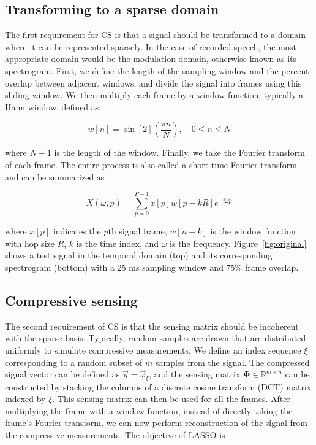 \documentclass[10pt,a4paper,twoside]{article}
\begin{document}
\subsection{Transforming to a sparse domain}\label{ssec:sparse}
The first requirement for CS is that a signal should be transformed to a domain where it can be represented sparsely. In the case of recorded speech, the most appropriate domain would be the modulation domain, otherwise known as its spectrogram. First, we define the length of the sampling window and the percent overlap between adjacent windows, and divide the signal into frames using this sliding window. We then multiply each frame by a window function, typically a Hann window, defined as

\begin{equation}\label{eq:hann}
	w[n] = \sin[2](\frac{\pi n}{N}), \quad 0 \leq n \leq N
\end{equation}

\noindent where $N+1$ is the length of the window. Finally, we take the Fourier transform of each frame. The entire process is also called a short-time Fourier transform and can be summarized as

\begin{equation}\label{eq:stft}
	X(\omega, p) = \sum_{p=0}^{P-1} x[p] w[p - kR] e^{-i\omega p}
\end{equation}

\noindent where $x[p]$ indicates the $p$th signal frame, $w[n-k]$ is the window function with hop size $R$, $k$ is the time index, and $\omega$ is the frequency. Figure~\ref{fig:original} shows a test signal in the temporal domain (top) and its corresponding spectrogram (bottom) with a 25 ms sampling window and 75\% frame overlap.

\subsection{Compressive sensing}\label{ssec:cs}
The second requirement of CS is that the sensing matrix should be incoherent with the sparse basis. Typically, random samples are drawn that are distributed uniformly to simulate compressive measurements. We define an index sequence $\xi$ corresponding to a random subset of $m$ samples from the signal. The compressed signal vector can be defined as $\vec{y} = \vec{x}_\xi$, and the sensing matrix $\bm\Phi \in \mathbb{R}^{m \times n}$ can be constructed by stacking the columns of a discrete cosine transform (DCT) matrix indexed by $\xi$. This sensing matrix can then be used for all the frames. After multiplying the frame with a window function, instead of directly taking the frame's Fourier transform, we can now perform reconstruction of the signal from the compressive measurements. The objective of LASSO is
\end{document}
